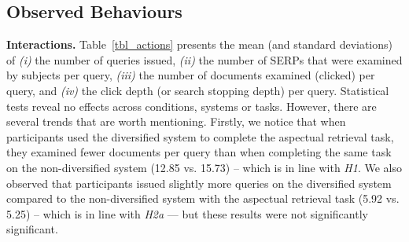 \subsection{Observed Behaviours}
\noindent\textbf{Interactions.} Table~\ref{tbl_actions} presents the mean (and standard deviations) of \textit{(i)} the number of queries issued, \textit{(ii)} the number of SERPs that were examined by subjects per query, \textit{(iii)} the number of documents examined (clicked) per query, and \textit{(iv)} the click depth (or search stopping depth) per query. %
Statistical tests reveal no effects across conditions, systems or tasks. However, there are several trends that are worth mentioning. Firstly, we notice that when participants used the diversified system to complete the aspectual retrieval task, they examined fewer documents per query than when completing the same task on the non-diversified system (12.85 vs. 15.73) -- which is in line with \emph{H1}. We also observed that participants issued slightly more queries on the diversified system compared to the non-diversified system with the aspectual retrieval task (5.92 vs. 5.25) -- which is in line with \emph{H2a} --- but these results were not significantly significant.



